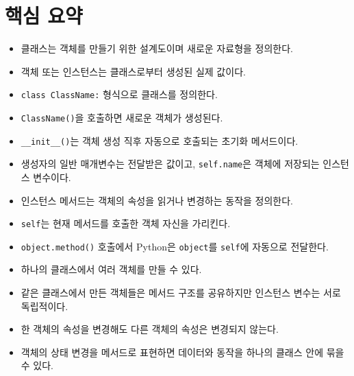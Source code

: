 \documentclass[11pt,a4paper]{article}
\begin{document}
\section{핵심 요약}

\begin{itemize}[leftmargin=1.5em]
    \item 클래스는 객체를 만들기 위한 설계도이며 새로운 자료형을 정의한다.
    \item 객체 또는 인스턴스는 클래스로부터 생성된 실제 값이다.
    \item \texttt{class ClassName:} 형식으로 클래스를 정의한다.
    \item \texttt{ClassName()}을 호출하면 새로운 객체가 생성된다.
    \item \texttt{\_\_init\_\_()}는 객체 생성 직후 자동으로 호출되는 초기화 메서드이다.
    \item 생성자의 일반 매개변수는 전달받은 값이고, \texttt{self.name}은 객체에 저장되는 인스턴스 변수이다.
    \item 인스턴스 메서드는 객체의 속성을 읽거나 변경하는 동작을 정의한다.
    \item \texttt{self}는 현재 메서드를 호출한 객체 자신을 가리킨다.
    \item \texttt{object.method()} 호출에서 Python은 \texttt{object}를 \texttt{self}에 자동으로 전달한다.
    \item 하나의 클래스에서 여러 객체를 만들 수 있다.
    \item 같은 클래스에서 만든 객체들은 메서드 구조를 공유하지만 인스턴스 변수는 서로 독립적이다.
    \item 한 객체의 속성을 변경해도 다른 객체의 속성은 변경되지 않는다.
    \item 객체의 상태 변경을 메서드로 표현하면 데이터와 동작을 하나의 클래스 안에 묶을 수 있다.
\end{itemize}
\end{document}

